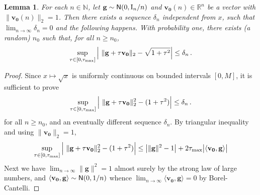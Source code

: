 \documentclass[11pt]{article}
\newtheorem{lemma}[claim]{Lemma}
\theoremstyle{definition}
\def\<{\langle}
\def\>{\rangle}
\def\naturals{{\mathbb N}}
\def\reals{\mathbb{R}}
\def\bg{\mathbf{g}}
\def\bvz{\mathbf{v_0}}
\def\normal{{\sf N}}
\def\id{{\rm I}}
\begin{document}
\begin{lemma}\label{lem:FGinnerproducts} 
For each $n \in \naturals$, let $\bg \sim  \normal(0,\id_n /n)$ and $\bvz(n)\in
\reals^n$ be a vector with $\|\bvz(n)\|_2=1$.
Then there exists a sequence $\delta_n$ independent from $x$, such
that $\lim_{n \to \infty} \delta_n = 0$ and the following happens.
With probability one, there exists (a random) $n_0$ such that, for all
$n\ge n_0$, 
% 
\begin{equation}
%
\sup_{\tau\in [0,\tau_{\rm max}] }\Big|~ \|\bg + \tau \bvz\|_2 -
\sqrt{1+\tau^2} \Big | \leq \delta_n\, .
%
\end{equation}
\end{lemma}
%
\begin{proof}
Since $x\mapsto\sqrt{x}$ is uniformly continuous on bounded intervals
$[0,M]$, it is sufficient to prove
% 
\begin{equation}
%
\sup_{\tau\in [0,\tau_{\rm max}] }\Big|~ \|\bg + \tau \bvz\|_2^2-
(1+\tau^2) \Big | \leq \delta_n\, .
%
\end{equation}
%
for all $n\ge n_0$, and an eventually different sequence $\delta_n$. 
By triangular inequality and using $\|\bvz\|_2 = 1$, 
%
\begin{align}
%
\sup_{\tau\in [0,\tau_{\rm max}] }\Big|~ \|\bg + \tau \bvz\|_2^2-
(1+\tau^2) \Big | \le \big|\|\bg\|^2-1\big|+2\tau_{\rm
  max}\big|\<\bvz,\bg\>\big|
%
\end{align}
%
Next we have $\lim_{n\to\infty}\|\bg\|^2=1$ almost surely by the
strong law of large numbers, and $\<\bvz,\bg\>\sim \normal(0,1/n)$
whence $\lim_{n\to\infty}\<\bvz,\bg\> =0$ by Borel-Cantelli. 
\end{proof}
\end{document}
